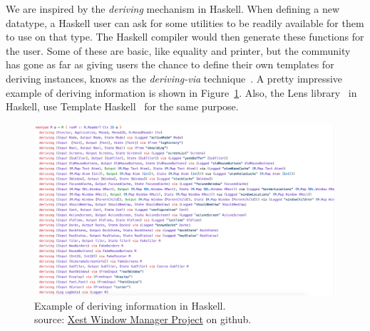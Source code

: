 We are inspired by the \emph{deriving} mechanism in Haskell. When defining a new datatype, a Haskell user can ask for some utilities to be readily available for them to use on that type. The Haskell compiler would then generate these functions for the user. Some of these are basic, like equality and printer, but the community has gone as far as giving users the chance to define their own templates for deriving instances, knows as the \emph{deriving-via} technique~\cite{loeh2018derivingVia}. A pretty impressive example of deriving information is shown in Figure~\ref{fig:deriving-via-example}. 
Also, the Lens library~\cite{lensesLib} in Haskell, use Template Haskell~\cite{sheard2002TH} for the same purpose. 
\begin{figure}
    \includegraphics[scale=0.5,width=\linewidth]{figures/deriving-via-example.png}
    \caption{Example of deriving information in Haskell. \\ source: \href{https://github.com/jhgarner/Xest-Window-Manager/blob/3741b35a69eb2cf8cd7320e186fd40134d1c1a56/src/Base/DoAll.hs}{Xest Window Manager Project} on github.}
    \label{fig:deriving-via-example}
\end{figure}


